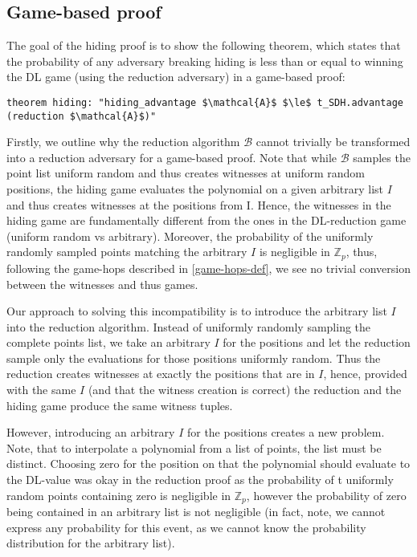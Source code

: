 \subsection{Game-based proof}
\label{security:hiding:game_based_transf}
The goal of the hiding proof is to show the following theorem, which states that the probability of any adversary breaking hiding is less than or equal to winning the DL game (using the reduction adversary) in a game-based proof:
\begin{lstlisting}[language=isabelle]
    theorem hiding: "hiding_advantage $\mathcal{A}$ $\le$ t_SDH.advantage (reduction $\mathcal{A}$)"
\end{lstlisting}

Firstly, we outline why the reduction algorithm $\mathcal{B}$ cannot trivially be transformed into a reduction adversary for a game-based proof. Note that while $\mathcal{B}$ samples the point list uniform random and thus creates witnesses at uniform random positions, the hiding game evaluates the polynomial on a given arbitrary list $I$ and thus creates witnesses at the positions from I. Hence, the witnesses in the hiding game are fundamentally different from the ones in the DL-reduction game (uniform random vs arbitrary). Moreover, the probability of the uniformly randomly sampled points matching the arbitrary $I$ is negligible in $\mathbb{Z}_p$, thus, following the game-hops described in \ref{game-hops-def}, we see no trivial conversion between the witnesses and thus games.

Our approach to solving this incompatibility is to introduce the arbitrary list $I$ into the reduction algorithm. Instead of uniformly randomly sampling the complete points list, we take an arbitrary $I$ for the positions and let the reduction sample only the evaluations for those positions uniformly random. Thus the reduction creates witnesses at exactly the positions that are in $I$, hence, provided with the same $I$  (and that the witness creation is correct) the reduction and the hiding game produce the same witness tuples.

However, introducing an arbitrary $I$ for the positions creates a new problem. Note, that to interpolate a polynomial from a list of points, the list must be distinct. Choosing zero for the position on that the polynomial should evaluate to the DL-value was okay in the reduction proof as the probability of t uniformly random points containing zero is negligible in $\mathbb{Z}_p$, however the probability of zero being contained in an arbitrary list is not negligible (in fact, note, we cannot express any probability for this event, as we cannot know the probability distribution for the arbitrary list).


